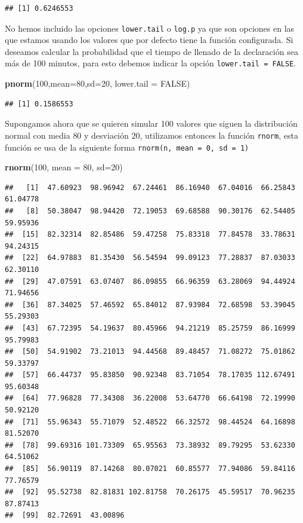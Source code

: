 \documentclass[]{book}
\newenvironment{Shaded}{\begin{snugshade}}{\end{snugshade}}
\newcommand{\DataTypeTok}[1]{\textcolor[rgb]{0.13,0.29,0.53}{#1}}
\newcommand{\DecValTok}[1]{\textcolor[rgb]{0.00,0.00,0.81}{#1}}
\newcommand{\KeywordTok}[1]{\textcolor[rgb]{0.13,0.29,0.53}{\textbf{#1}}}
\newcommand{\NormalTok}[1]{#1}
\newcommand{\OtherTok}[1]{\textcolor[rgb]{0.56,0.35,0.01}{#1}}
\begin{document}
\begin{verbatim}
## [1] 0.6246553
\end{verbatim}

No hemos incluido las opciones \texttt{lower.tail} o \texttt{log.p} ya que son opciones en las que estamos usando los valores que por defecto tiene la función configurada. Si deseamos calcular la probabilidad que el tiempo de llenado de la declaración sea más de 100 minutos, para esto debemos indicar la opción \texttt{lower.tail\ =\ FALSE}.

\begin{Shaded}
\begin{Highlighting}[]
\KeywordTok{pnorm}\NormalTok{(}\DecValTok{100}\NormalTok{,}\DataTypeTok{mean=}\DecValTok{80}\NormalTok{,}\DataTypeTok{sd=}\DecValTok{20}\NormalTok{, }\DataTypeTok{lower.tail =} \OtherTok{FALSE}\NormalTok{)}
\end{Highlighting}
\end{Shaded}

\begin{verbatim}
## [1] 0.1586553
\end{verbatim}

Supongamos ahora que se quieren simular 100 valores que siguen la distribución normal con media \(80\) y desviación \(20\), utilizamos entonces la función \texttt{rnorm}, esta función se usa de la siguiente forma \texttt{rnorm(n,\ mean\ =\ 0,\ sd\ =\ 1)}

\begin{Shaded}
\begin{Highlighting}[]
\KeywordTok{rnorm}\NormalTok{(}\DecValTok{100}\NormalTok{, }\DataTypeTok{mean =} \DecValTok{80}\NormalTok{, }\DataTypeTok{sd=}\DecValTok{20}\NormalTok{)}
\end{Highlighting}
\end{Shaded}

\begin{verbatim}
##   [1]  47.60923  98.96942  67.24461  86.16940  67.04016  66.25843  61.04778
##   [8]  50.38047  98.94420  72.19053  69.68588  90.30176  62.54405  59.95936
##  [15]  82.32314  82.85486  59.47258  75.83318  77.84578  33.78631  94.24315
##  [22]  64.97883  81.35430  56.54594  99.09123  77.28837  87.03033  62.30110
##  [29]  47.07591  63.07407  86.09855  66.96359  63.28069  94.44924  71.94656
##  [36]  87.34025  57.46592  65.84012  87.93984  72.68598  53.39045  55.29303
##  [43]  67.72395  54.19637  80.45966  94.21219  85.25759  86.16999  95.79983
##  [50]  54.91902  73.21013  94.44568  89.48457  71.08272  75.01862  59.33797
##  [57]  66.44737  95.83850  90.92348  83.71054  78.17035 112.67491  95.60348
##  [64]  77.96828  77.34308  36.22008  53.64770  66.64198  72.19990  50.92120
##  [71]  55.96343  55.71079  52.48522  66.32572  98.44524  64.16898  81.52070
##  [78]  99.69316 101.73309  65.95563  73.38932  89.79295  53.62330  64.51062
##  [85]  56.90119  87.14268  80.07021  60.85577  77.94086  59.84116  77.76579
##  [92]  95.52738  82.81831 102.81758  70.26175  45.59517  70.96235  87.87413
##  [99]  82.72691  43.00896
\end{verbatim}
\end{document}
